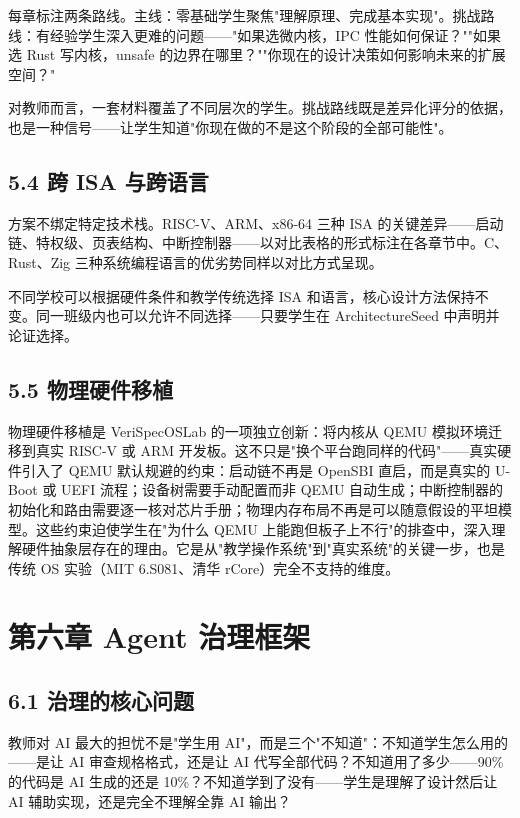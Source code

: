 \documentclass[UTF8,a4paper,12pt,openany]{ctexrep}
\begin{document}
每章标注两条路线。主线：零基础学生聚焦"理解原理、完成基本实现"。挑战路线：有经验学生深入更难的问题------"如果选微内核，IPC 性能如何保证？""如果选 Rust 写内核，unsafe 的边界在哪里？""你现在的设计决策如何影响未来的扩展空间？"

对教师而言，一套材料覆盖了不同层次的学生。挑战路线既是差异化评分的依据，也是一种信号------让学生知道"你现在做的不是这个阶段的全部可能性"。

\section{5.4 跨 ISA 与跨语言}\label{54-ux8de8-isa-ux4e0eux8de8ux8bedux8a00}

方案不绑定特定技术栈。RISC-V、ARM、x86-64 三种 ISA 的关键差异------启动链、特权级、页表结构、中断控制器------以对比表格的形式标注在各章节中。C、Rust、Zig 三种系统编程语言的优劣势同样以对比方式呈现。

不同学校可以根据硬件条件和教学传统选择 ISA 和语言，核心设计方法保持不变。同一班级内也可以允许不同选择------只要学生在 ArchitectureSeed 中声明并论证选择。

\section{5.5 物理硬件移植}\label{55-ux7269ux7406ux786cux4ef6ux79fbux690d}

物理硬件移植是 VeriSpecOSLab 的一项独立创新：将内核从 QEMU 模拟环境迁移到真实 RISC-V 或 ARM 开发板。这不只是"换个平台跑同样的代码"------真实硬件引入了 QEMU 默认规避的约束：启动链不再是 OpenSBI 直启，而是真实的 U-Boot 或 UEFI 流程；设备树需要手动配置而非 QEMU 自动生成；中断控制器的初始化和路由需要逐一核对芯片手册；物理内存布局不再是可以随意假设的平坦模型。这些约束迫使学生在"为什么 QEMU 上能跑但板子上不行"的排查中，深入理解硬件抽象层存在的理由。它是从"教学操作系统"到"真实系统"的关键一步，也是传统 OS 实验（MIT 6.S081、清华 rCore）完全不支持的维度。


\chapter{第六章 Agent 治理框架}\label{ux7b2cux516dux7ae0-agent-ux6cbbux7406ux6846ux67b6}

\section{6.1 治理的核心问题}\label{61-ux6cbbux7406ux7684ux6838ux5fc3ux95eeux9898}

教师对 AI 最大的担忧不是"学生用 AI"，而是三个"不知道"：不知道学生怎么用的------是让 AI 审查规格格式，还是让 AI 代写全部代码？不知道用了多少------90\% 的代码是 AI 生成的还是 10\%？不知道学到了没有------学生是理解了设计然后让 AI 辅助实现，还是完全不理解全靠 AI 输出？
\end{document}
